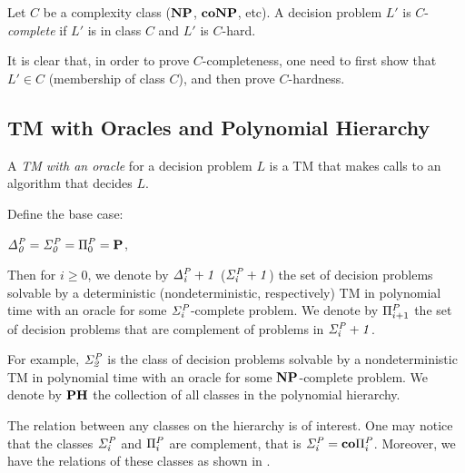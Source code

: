 \begin{definition}
	Let $C$ be a complexity class ($\textbf{NP}$, $\textbf{coNP}$, etc).
	A decision problem $L'$ is $C$-\textit{complete} if $L'$ is in class $C$ and $L'$ is $C$-hard.
\end{definition}
It is clear that, in order to prove $C$-completeness, one need to first show
that $L' \in C$ (membership of class $C$), and then prove $C$-hardness.



\subsection{TM with Oracles and Polynomial Hierarchy}
A \textit{TM with an oracle} for a decision problem $L$ is a TM that makes calls to an algorithm that
decides $L$.

\begin{definition}
	Define the base case:
	\begin{center}
		$\mathit{\Delta^P_0} = \mathit{\Sigma^P_0} = \Pi^P_{0} = \textbf{P}$,
	\end{center}
	Then for $i \geq 0$, we denote by $\mathit{\Delta^P_i+1}$ ($\mathit{\Sigma^P_i+1}$) 
	the set of decision problems solvable
	by a deterministic (nondeterministic, respectively) TM 
	in polynomial time with an oracle for some $\mathit{\Sigma^P_i}$-complete problem.
	We denote by $\Pi^P_{i+1}$ the set of decision problems that are complement
	of problems in $\mathit{\Sigma^P_i+1}$.
\end{definition}
For example, $\mathit{\Sigma^P_2}$ is the class of decision problems solvable by a nondeterministic
TM in polynomial time with an oracle for some $\textbf{NP}$-complete problem.
We denote by $\textbf{PH}$ the collection of all classes in the polynomial hierarchy.

The relation between any classes on the hierarchy is of interest.
One may notice that the classes $\mathit{\Sigma^P_i}$ and $\Pi^P_{i}$ are
complement, that is $\mathit{\Sigma^P_i} = \textbf{co}\Pi^P_{i}$.
Moreover, we have the relations of these classes as shown in .

